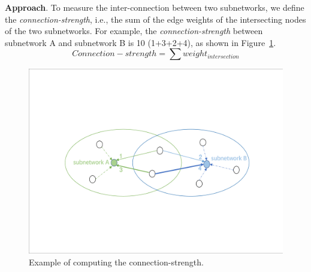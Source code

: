 \documentclass[sigconf]{acmart}
\begin{document}




\noindent\textbf{Approach}. 
To measure the inter-connection between two subnetworks, we define the \emph{connection-strength}, i.e., the sum of the edge weights of the intersecting nodes of the two subnetworks. For example, the \emph{connection-strength} between subnetwork A and subnetwork B is 10 (1+3+2+4), as shown in Figure~\ref{fig:conndefine}.
\begin{equation}
Connection-strength = \sum weight_{intersection}\label{eq}
\end{equation}


\begin{figure}[htbp]
\centering
  \includegraphics[width=0.9\columnwidth]{picture/connection5.pdf}
\caption{Example of computing the connection-strength.}
\label{fig:conndefine}
\end{figure}



\end{document}
